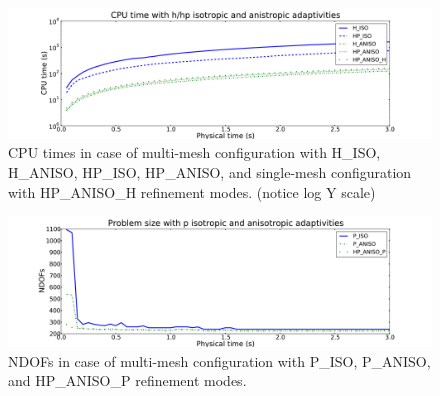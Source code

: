 \begin{figure}[!ht]
  \begin{centering}
  \includegraphics[width=\columnwidth]{isoaniso_cpu}
  \caption{\label{fig:isoanisocpu} CPU times in case 
  of multi-mesh configuration with H\_ISO, H\_ANISO,
  HP\_ISO, HP\_ANISO, and single-mesh configuration with HP\_ANISO\_H
  refinement modes. (notice log Y scale)}
  \end{centering}
\end{figure}

\begin{figure}[!ht]
  \begin{centering}
  \includegraphics[width=\columnwidth]{isoanisop_dof}
  \caption{\label{fig:isoanisopdof} NDOFs in case 
  of multi-mesh configuration with P\_ISO, P\_ANISO, and
  HP\_ANISO\_P refinement modes.}
  \end{centering}
\end{figure}

